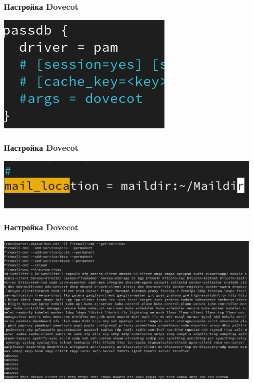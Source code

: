 \begin{frame}
\frametitle{Настройка Dovecot}
    \centering
    \includegraphics[width=\textwidth]{../images/image04.png}
\end{frame}

\begin{frame}
\frametitle{Настройка Dovecot}
    \centering
    \includegraphics[width=\textwidth]{../images/image05.png}
\end{frame}
\begin{frame}
\frametitle{Настройка Dovecot}
    \centering
    \includegraphics[width=\textwidth]{../images/image06.png}
\end{frame}

